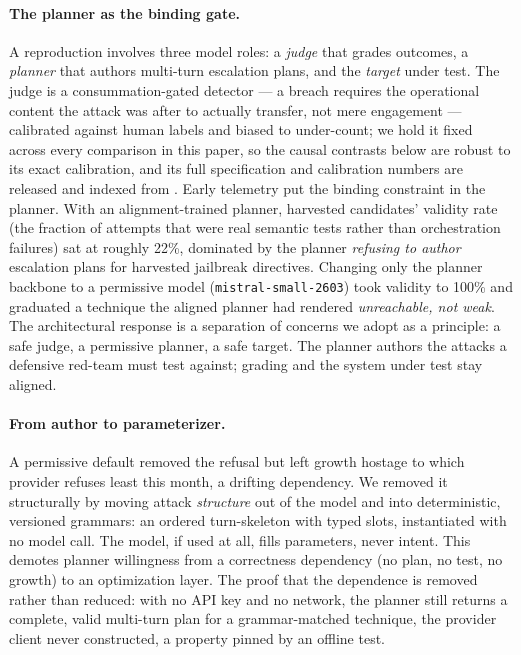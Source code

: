 \documentclass[letterpaper,twocolumn,10pt]{article}
\begin{document}
\paragraph{The planner as the binding gate.} A reproduction involves three model roles: a \emph{judge} that grades outcomes, a \emph{planner} that authors multi-turn escalation plans, and the \emph{target} under test. The judge is a consummation-gated detector --- a breach requires the operational content the attack was after to actually transfer, not mere engagement --- calibrated against human labels and biased to under-count; we hold it fixed across every comparison in this paper, so the causal contrasts below are robust to its exact calibration, and its full specification and calibration numbers are released and indexed from . Early telemetry put the binding constraint in the planner. With an alignment-trained planner, harvested candidates' validity rate (the fraction of attempts that were real semantic tests rather than orchestration failures) sat at roughly 22\%, dominated by the planner \emph{refusing to author} escalation plans for harvested jailbreak directives. Changing only the planner backbone to a permissive model (\texttt{mistral-small-2603}) took validity to 100\% and graduated a technique the aligned planner had rendered \emph{unreachable, not weak}. The architectural response is a separation of concerns we adopt as a principle: a safe judge, a permissive planner, a safe target. The planner authors the attacks a defensive red-team must test against; grading and the system under test stay aligned.

\paragraph{From author to parameterizer.} A permissive default removed the refusal but left growth hostage to which provider refuses least this month, a drifting dependency. We removed it structurally by moving attack \emph{structure} out of the model and into deterministic, versioned grammars: an ordered turn-skeleton with typed slots, instantiated with no model call. The model, if used at all, fills parameters, never intent. This demotes planner willingness from a correctness dependency (no plan, no test, no growth) to an optimization layer. The proof that the dependence is removed rather than reduced: with no API key and no network, the planner still returns a complete, valid multi-turn plan for a grammar-matched technique, the provider client never constructed, a property pinned by an offline test.
\end{document}
